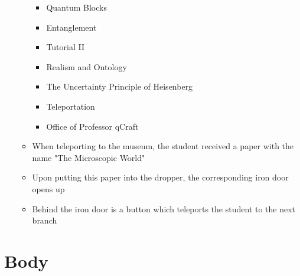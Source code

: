 \documentclass[11pt,twoside]{report} %
\begin{document}
\begin{itemize}
\begin{itemize}
\begin{itemize}
			\item Quantum Blocks
			\item Entanglement
			\item Tutorial II
			\item Realism and Ontology
			\item The Uncertainty Principle of Heisenberg
			\item Teleportation
			\item Office of Professor qCraft
		\end{itemize}
		\item When teleporting to the museum, the student received a paper with the name "The Microscopic World"
		\item Upon putting this paper into the dropper, the corresponding iron door opens up
		\item Behind the iron door is a button which teleports the student to the next branch
	\end{itemize}
\end{itemize}

\section{Body}
\end{document}
